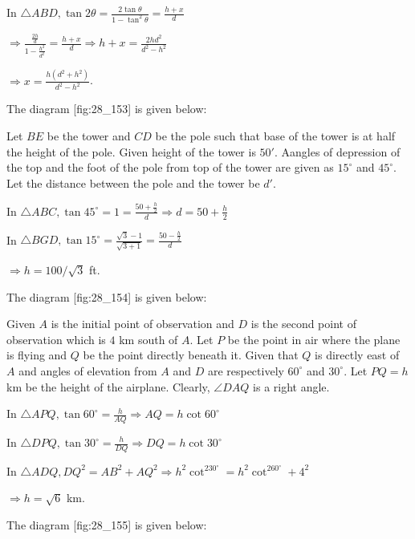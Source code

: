   In $\triangle ABD, \tan2\theta = \frac{2\tan\theta}{1 - \tan^2\theta} = \frac{h + x}{d}$

  $\Rightarrow \frac{\frac{2h}{d}}{1 - \frac{h^2}{d^2}} = \frac{h + x}{d} \Rightarrow h + x =
  \frac{2hd^2}{d^2 - h^2}$

  $\Rightarrow x = \frac{h(d^2 + h^2)}{d^2 - h^2}$.

\item The diagram [fig:28_153] is given below:

  \startplacefigure[reference=fig:28_153]
    \externalfigure[28_153.pdf]
  \stopplacefigure

  Let $BE$ be the tower and $CD$ be the pole such that base of the tower is at half the
  height of the pole. Given height of the tower is $50'$. Aangles of depression of the top and the
  foot of the pole from top of the tower are given as $15^\circ$ and $45^\circ$. Let the
  distance between the pole and the tower be $d'$.

  In $\triangle ABC, \tan45^\circ = 1 = \frac{50 + \frac{h}{2}}{d}\Rightarrow d = 50 + \frac{h}{2}$

  In $\triangle BGD, \tan15^\circ = \frac{\sqrt{3} - 1}{\sqrt{3 + 1}} = \frac{50 - \frac{h}{2}}{d}$

  $\Rightarrow h = 100/\sqrt{3}$ ft.

\item The diagram [fig:28_154] is given below:

  \startplacefigure[reference=fig:28_154]
    \externalfigure[28_154.pdf]
  \stopplacefigure

  Given $A$ is the initial point of observation and $D$ is the second point of observation
  which is $4$ km south of $A$. Let $P$ be the point in air where the plane is flying
  and $Q$ be the point directly beneath it. Given that $Q$ is directly east of $A$ and
  angles of elevation from $A$ and $D$ are respectively $60^\circ$ and
  $30^\circ$. Let $PQ = h$ km be the height of the airplane. Clearly, $\angle DAQ$ is a
  right angle.

  In $\triangle APQ, \tan60^\circ = \frac{h}{AQ} \Rightarrow AQ = h\cot60^\circ$

  In $\triangle DPQ, \tan30^\circ = \frac{h}{DQ} \Rightarrow DQ = h\cot30^\circ$

  In $\triangle ADQ, DQ^2 = AB^2 + AQ^2 \Rightarrow h^2\cot^230^\circ = h^2\cot^260^\circ + 4^2$

  $\Rightarrow h = \sqrt{6}$ km.

\item The diagram [fig:28_155] is given below:

